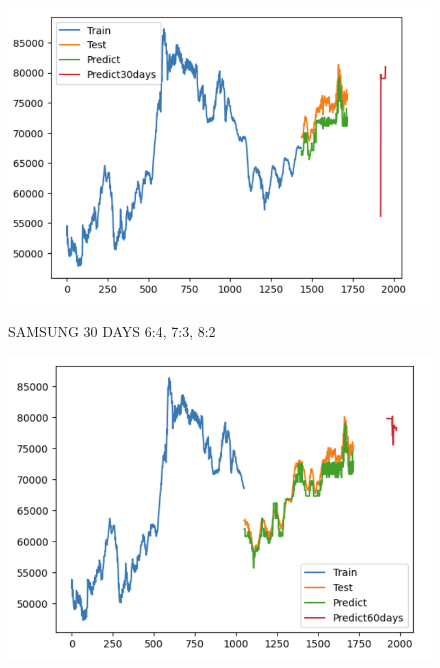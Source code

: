 \documentclass{article}
\begin{document}
\begin{multicols}{2}
\begin{figure}[H]
\begin{minipage}{0.15\textwidth}
    \label{fig:2}
    \end{minipage}%
    \begin{minipage}{0.15\textwidth}
    \centering
    \includegraphics[width=1\textwidth]{Image/Light GBM/SS_8_2_30.png}

    \label{fig:3}
    \end{minipage}
    \caption{SAMSUNG 30 DAYS  6:4, 7:3, 8:2 }
\end{figure}

\begin{figure}[H]
    \centering
    \begin{minipage}{0.15\textwidth}
    \centering
    \includegraphics[width=1\textwidth]{Image/Light GBM/SS_6_4_60.png}
   

\end{minipage}
\end{figure}
\end{multicols}
\end{document}
